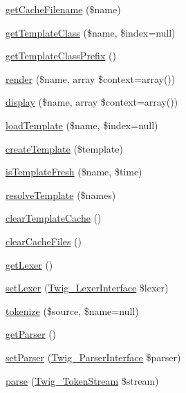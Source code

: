 \begin{DoxyCompactItemize}
\item 
\hyperlink{classTwig__Environment_a9733292b45866c9a6abcddb342691ce5}{get\+Cache\+Filename} (\$name)
\item 
\hyperlink{classTwig__Environment_abfd9aa2e933116f37d342478eb22a745}{get\+Template\+Class} (\$name, \$index=null)
\item 
\hyperlink{classTwig__Environment_a94e721ee065ee8130d849d1fdd6feb52}{get\+Template\+Class\+Prefix} ()
\item 
\hyperlink{classTwig__Environment_ac5c44b06c5a0ae2c220f210f8b36553a}{render} (\$name, array \$context=array())
\item 
\hyperlink{classTwig__Environment_ad116855a9721ed8463e03b3e6b94d099}{display} (\$name, array \$context=array())
\item 
\hyperlink{classTwig__Environment_a7ebc08da8671c71378bf794f77a5b300}{load\+Template} (\$name, \$index=null)
\item 
\hyperlink{classTwig__Environment_a6c4b80c1f6cc735b8341963d721d7b51}{create\+Template} (\$template)
\item 
\hyperlink{classTwig__Environment_afc931759e55bac3245b6ee2ba479b0a7}{is\+Template\+Fresh} (\$name, \$time)
\item 
\hyperlink{classTwig__Environment_af498f9376646cf23e7a13dcd7ef48f4d}{resolve\+Template} (\$names)
\item 
\hyperlink{classTwig__Environment_ac660abe6b05e3ba5afde549aa0e2313d}{clear\+Template\+Cache} ()
\item 
\hyperlink{classTwig__Environment_a0579496482829a15be49cf4b438e773f}{clear\+Cache\+Files} ()
\item 
\hyperlink{classTwig__Environment_a0c891f90cdea89142da32c1c75eecbc0}{get\+Lexer} ()
\item 
\hyperlink{classTwig__Environment_a3796b68c25623faa9bed8fdd59534fca}{set\+Lexer} (\hyperlink{interfaceTwig__LexerInterface}{Twig\+\_\+\+Lexer\+Interface} \$lexer)
\item 
\hyperlink{classTwig__Environment_a6d2536c3de953135119c94397d969af8}{tokenize} (\$source, \$name=null)
\item 
\hyperlink{classTwig__Environment_afa1f06190d95e7a219a61ff6a9dfeca2}{get\+Parser} ()
\item 
\hyperlink{classTwig__Environment_a2f07c80b37aea425abedb58e808c3544}{set\+Parser} (\hyperlink{interfaceTwig__ParserInterface}{Twig\+\_\+\+Parser\+Interface} \$parser)
\item 
\hyperlink{classTwig__Environment_a8237174860a169234b526d705819c340}{parse} (\hyperlink{classTwig__TokenStream}{Twig\+\_\+\+Token\+Stream} \$stream)

\end{DoxyCompactItemize}
